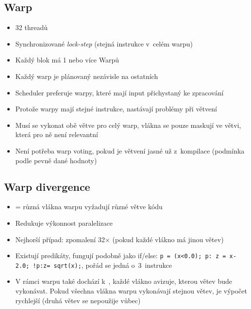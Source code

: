 \subsection{Warp}
\begin{itemize}
    \item 32 threadů
    \item Synchronizované \textit{lock-step} (stejná instrukce v~celém warpu)
    \item Každý blok má 1 nebo více Warpů
    \item Každý warp je plánovaný nezávisle na ostatních
    \item Scheduler preferuje warpy, které mají input přichystaný ke zpracování
    \item Protože warpy mají stejné instrukce, nastávají problémy při větvení
    \item Musí se vykonat obě větve pro celý warp, vlákna se pouze maskují ve větvi, která pro ně není relevantní
    \item Není potřeba warp voting, pokud je větvení jasné už z~kompilace (podmínka podle pevně dané hodnoty)
\end{itemize}

\subsection{Warp divergence}
\begin{itemize}
    \item = různá vlákna warpu vyžadují různé větve kódu
    \item Redukuje výkonnost paralelizace
    \item Nejhorší případ: zpomalení 32\(\times\) (pokud každé vlákno má jinou větev)
    \item Existují predikáty, fungují podobně jako if/else: \texttt{p = (x<0.0); p: z = x-2.0; !p:z= sqrt(x);}, pořád se jedná o~3~instrukce
    \item V rámci warpu také dochází k~, každé vlákno avizuje, kterou větev bude vykonávat. Pokud všechna vlákna warpu vykonávají stejnou větev, je výpočet rychlejší (druhá větev se nepoužije vůbec)
\end{itemize}

